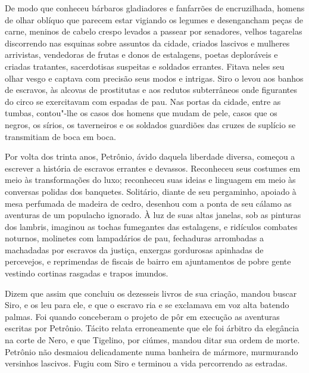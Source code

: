 De modo que conheceu bárbaros gladiadores e fanfarrões de encruzilhada,
homens de olhar oblíquo que parecem estar vigiando os legumes e
desengancham peças de carne, meninos de cabelo crespo levados a passear
por senadores, velhos tagarelas discorrendo nas esquinas sobre assuntos da
cidade, criados lascivos e mulheres arrivistas, vendedoras de frutas e
donos de estalagens, poetas deploráveis e criadas tratantes, sacerdotisas
suspeitas e soldados errantes. Fitava neles seu olhar vesgo e captava com
precisão seus modos e intrigas. Siro o levou aos banhos de escravos, às
alcovas de prostitutas e aos redutos subterrâneos onde figurantes do circo
se exercitavam com espadas de pau. Nas portas da cidade, entre as tumbas,
contou"-lhe os casos dos homens que mudam de pele, casos que os negros, os
sírios, os taverneiros e os soldados guardiões das cruzes de suplício se
transmitiam de boca em boca.

Por volta dos trinta anos, Petrônio, ávido daquela liberdade diversa,
começou a escrever a história de escravos errantes e devassos. Reconheceu
seus costumes em meio às transformações do luxo; reconheceu suas ideias e
linguagem em meio às conversas polidas dos banquetes. Solitário, diante de
seu pergaminho, apoiado à mesa perfumada de madeira de cedro, desenhou com
a ponta de seu cálamo as aventuras de um populacho ignorado. À luz de suas
altas janelas, sob as pinturas dos lambris, imaginou as tochas fumegantes
das estalagens, e ridículos combates noturnos, molinetes com lampadários
de pau, fechaduras arrombadas a machadadas por escravos da justiça,
enxergas gordurosas apinhadas de percevejos, e reprimendas de fiscais de
bairro em ajuntamentos de pobre gente vestindo cortinas rasgadas e trapos
imundos.

Dizem que assim que concluiu os dezesseis livros de sua criação, mandou
buscar Siro, e os leu para ele, e que o escravo ria e se exclamava em voz
alta batendo palmas. Foi quando conceberam o projeto de pôr em execução as
aventuras escritas por Petrônio. Tácito relata erroneamente que ele foi
árbitro da elegância na corte de Nero, e que Tigelino, por ciúmes, mandou
ditar sua ordem de morte. Petrônio não desmaiou delicadamente numa
banheira de mármore, murmurando versinhos lascivos. Fugiu com Siro e
terminou a vida percorrendo as estradas.

